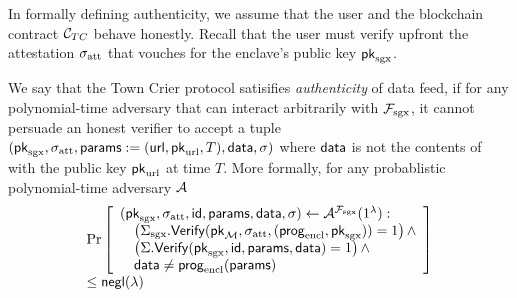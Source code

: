 In formally defining 
authenticity, 
we assume that the user and the blockchain
contract ${\cal C}_{TC}$ behave honestly.
Recall that the user must verify 
upfront the attestation ${\sigma_{\textrm{att}}}$ 
that vouches 
for the enclave's public key ${\sf pk}_{\textrm{sgx}}$.

\begin{definition}[Authenticity]
We say that the Town Crier protocol 
satisifies {\it authenticity} of data feed,
if for any polynomial-time adversary
that can interact arbitrarily with $\mathcal{F}_{\textrm{sgx}}$,
it cannot 
persuade an honest verifier to accept
a tuple $({\sf pk}_{\textrm{sgx}}, {\sigma_{\textrm{att}}}, {\sf params}:=({{\sf url}}, {\sf pk}_{\textrm{url}}, T), {\sf data}, \sigma)$
where ${\sf data}$ is not 
the contents of 
\weburl with the public key ${\sf pk}_{\textrm{url}}$ at time $T$.
More formally, 
for any probablistic polynomial-time adversary $\mathcal{A}$
\[
\begin{array}{l}
\Pr\left[
\begin{array}{l}
({\sf pk}_{\textrm{sgx}}, {\sigma_{\textrm{att}}}, {\sf id}, {\sf params}, {\sf data}, \sigma) \leftarrow 
\mathcal{A}^{\mathcal{F}_{\textrm{sgx}}}(1^\lambda) :\\
\quad \left({\Sigma_{\textrm{sgx}}}.{\sf Verify}({\sf pk}_{\mathcal{M}}, {\sigma_{\textrm{att}}}, ({\sf prog}_{\textrm{encl}}, {\sf pk}_{\textrm{sgx}})) = 1\right) \wedge \\
\quad \left(\Sigma.{\sf Verify}({\sf pk}_{\textrm{sgx}}, {\sf id}, {\sf params}, {\sf data})  = 1\right) \wedge\\
\quad {\sf data} \neq {\sf prog}_{\textrm{encl}}({\sf params}) 
\end{array}
\right] \\[3pt] 
\leq {\sf negl}(\lambda)
\end{array}
\]
\label{defn:auth}
\end{definition}


